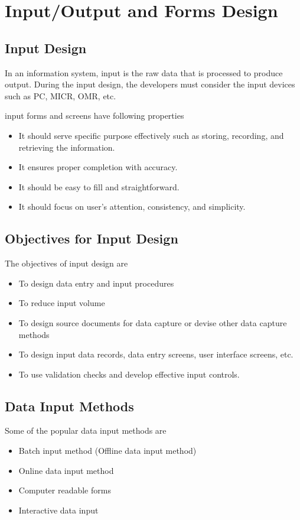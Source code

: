 \documentclass[a4paper,12pt]{book}
\begin{document}
	\tableofcontents
	\chapter{Input/Output and Forms Design}
	\section{Input Design}
	In an information system, input is the raw data that is processed to produce output. During the input design, the developers must consider the input devices such as PC, MICR, OMR, etc.
	
	input forms and screens have following properties 
		\begin{itemize}
	\item	It should serve specific purpose effectively such as storing, recording, and retrieving the information.
	\item	It ensures proper completion with accuracy.
	\item It should be easy to fill and straightforward.
	\item	It should focus on user’s attention, consistency, and simplicity.
		\end{itemize}
	
	
	\section{Objectives for Input Design}
	The objectives of input design are 
	\begin{itemize}
	\item 	To design data entry and input procedures
	\item 	To reduce input volume
	\item	To design source documents for data capture or devise other data capture methods
	\item 	To design input data records, data entry screens, user interface screens, etc.
	\item 	To use validation checks and develop effective input controls.
\end{itemize}
	
\section{Data Input Methods}
	Some of the popular data input methods are 
\begin{itemize}
	\item 	Batch input method (Offline data input method)
	\item 	Online data input method
	\item 	Computer readable forms
	\item 	Interactive data input
\end{itemize}
	
\end{document}
